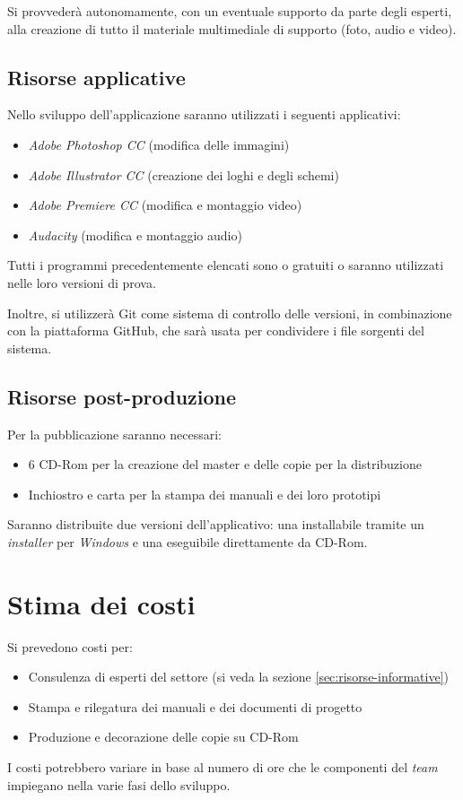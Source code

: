 Si provvederà autonomamente, con un eventuale supporto da parte degli esperti,
alla creazione di tutto il materiale multimediale di supporto (foto, audio e
video).

\subsection{Risorse applicative}
Nello sviluppo dell'applicazione saranno utilizzati i seguenti applicativi:
\begin{itemize}
	\item \emph{Adobe Photoshop CC} (modifica delle immagini)
	\item \emph{Adobe Illustrator CC} (creazione dei loghi e degli schemi)
	\item \emph{Adobe Premiere CC} (modifica e montaggio video)
	\item \emph{Audacity} (modifica e montaggio audio)
\end{itemize}
Tutti i programmi precedentemente elencati sono o gratuiti o saranno utilizzati
nelle loro versioni di prova.

Inoltre, si utilizzerà Git come sistema di controllo delle versioni, in
combinazione con la piattaforma GitHub, che sarà usata per condividere i file
sorgenti del sistema.

\subsection{Risorse post-produzione}
Per la pubblicazione saranno necessari:
\begin{itemize}
	\item 6 CD-Rom per la creazione del master e delle copie per la
	distribuzione
	\item Inchiostro e carta per la stampa dei manuali e dei loro prototipi
\end{itemize}
Saranno distribuite due versioni dell'applicativo: una installabile tramite un
\textit{installer} per \textit{Windows} e una eseguibile direttamente da CD-Rom.

\section{Stima dei costi}
Si prevedono costi per:
\begin{itemize}
	\item Consulenza di esperti del settore (si veda la sezione
	\ref{sec:risorse-informative})
	\item Stampa e rilegatura dei manuali e dei documenti di progetto
	\item Produzione e decorazione delle copie su CD-Rom
\end{itemize}

I costi potrebbero variare in base al numero di ore che le componenti del
\textit{team} impiegano nella varie fasi dello sviluppo.